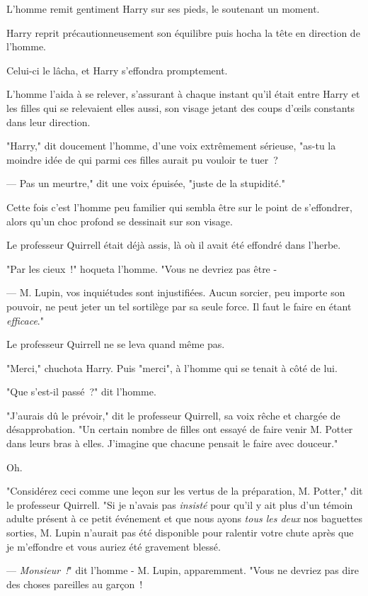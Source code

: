 L'homme remit gentiment Harry sur ses pieds, le soutenant un moment.

Harry reprit précautionneusement son équilibre puis hocha la tête en direction de l'homme.

Celui-ci le lâcha, et Harry s'effondra promptement.

L'homme l'aida à se relever, s'assurant à chaque instant qu'il était entre Harry et les filles qui se relevaient elles aussi, son visage jetant des coups d'œils constants dans leur direction.

"Harry," dit doucement l'homme, d'une voix extrêmement sérieuse, "as-tu la moindre idée de qui parmi ces filles aurait pu vouloir te tuer~?

--- Pas un meurtre," dit une voix épuisée, "juste de la stupidité."

Cette fois c'est l'homme peu familier qui sembla être sur le point de s'effondrer, alors qu'un choc profond se dessinait sur son visage.

Le professeur Quirrell était déjà assis, là où il avait été effondré dans l'herbe.

"Par les cieux~!" hoqueta l'homme. "Vous ne devriez pas être -

--- M. Lupin, vos inquiétudes sont injustifiées. Aucun sorcier, peu importe son pouvoir, ne peut jeter un tel sortilège par sa seule force. Il faut le faire en étant \emph{efficace}."

Le professeur Quirrell ne se leva quand même pas.

"Merci," chuchota Harry. Puis "merci", à l'homme qui se tenait à côté de lui.

"Que s'est-il passé~?" dit l'homme.

"J'aurais dû le prévoir," dit le professeur Quirrell, sa voix rêche et chargée de désapprobation. "Un certain nombre de filles ont essayé de faire venir M. Potter dans leurs bras à elles. J'imagine que chacune pensait le faire avec douceur."

Oh.

"Considérez ceci comme une leçon sur les vertus de la préparation, M. Potter," dit le professeur Quirrell. "Si je n'avais pas \emph{insisté} pour qu'il y ait plus d'un témoin adulte présent à ce petit événement et que nous ayons \emph{tous les deux} nos baguettes sorties, M. Lupin n'aurait pas été disponible pour ralentir votre chute après que je m'effondre et vous auriez été gravement blessé.

--- \emph{Monsieur~!}" dit l'homme - M. Lupin, apparemment. "Vous ne devriez pas dire des choses pareilles au garçon~!

